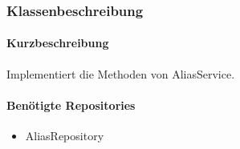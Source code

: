 \subsubsection*{Klassenbeschreibung}%
\paragraph*{Kurzbeschreibung}
Implementiert die Methoden von AliasService.
\paragraph*{Benötigte Repositories}
\begin{itemize}
    \item AliasRepository
\end{itemize}
